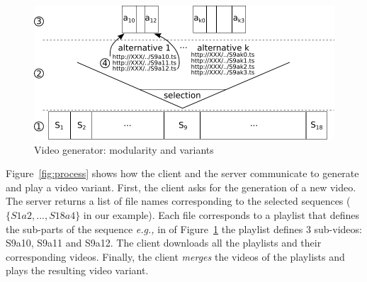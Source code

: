\documentclass{sig-alternate}
\newcommand{\eg}{\emph{e.g.,}\xspace}
\begin{document}
 
\begin{figure}
\centering
\includegraphics[width=\getVal{bref_size}\linewidth]{figures/bref-generator.pdf}
\vspace*{-4mm}
\caption{\label{fig:generator}Video generator: modularity and variants}
\end{figure}

Figure~\ref{fig:process} shows how the client and the server communicate to generate and play a video variant. First, the client asks for the generation of a new video. The server returns a list of file names corresponding to the selected sequences ($\{S1a2, ..., S18a4\}$ in our example).  
Each file corresponds to a playlist that defines the sub-parts of the sequence \eg in  of Figure~\ref{fig:generator} the playlist defines 3 sub-videos: S9a10, S9a11 and S9a12.
The client downloads all the playlists and their corresponding videos. Finally, the client \emph{merges} the videos of the playlists and plays the resulting video variant.
\end{document}
